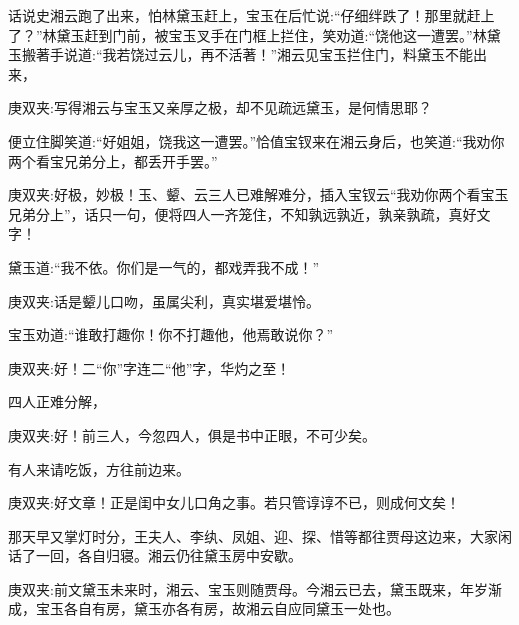 \begin{parag}
    话说史湘云跑了出来，怕林黛玉赶上，宝玉在后忙说:“仔细绊跌了！那里就赶上了？”林黛玉赶到门前，被宝玉叉手在门框上拦住，笑劝道:“饶他这一遭罢。”林黛玉搬著手说道:“我若饶过云儿，再不活著！”湘云见宝玉拦住门，料黛玉不能出来，\begin{note}庚双夹:写得湘云与宝玉又亲厚之极，却不见疏远黛玉，是何情思耶？\end{note}便立住脚笑道:“好姐姐，饶我这一遭罢。”恰值宝钗来在湘云身后，也笑道:“我劝你两个看宝兄弟分上，都丢开手罢。”\begin{note}庚双夹:好极，妙极！玉、颦、云三人已难解难分，插入宝钗云“我劝你两个看宝玉兄弟分上”，话只一句，便将四人一齐笼住，不知孰远孰近，孰亲孰疏，真好文字！\end{note}黛玉道:“我不依。你们是一气的，都戏弄我不成！”\begin{note}庚双夹:话是颦儿口吻，虽属尖利，真实堪爱堪怜。\end{note}宝玉劝道:“谁敢打趣你！你不打趣他，他焉敢说你？”\begin{note}庚双夹:好！二“你”字连二“他”字，华灼之至！\end{note}四人正难分解，\begin{note}庚双夹:好！前三人，今忽四人，俱是书中正眼，不可少矣。\end{note}有人来请吃饭，方往前边来。\begin{note}庚双夹:好文章！正是闺中女儿口角之事。若只管谆谆不已，则成何文矣！\end{note}
\end{parag}


\begin{parag}
    那天早又掌灯时分，王夫人、李纨、凤姐、迎、探、惜等都往贾母这边来，大家闲话了一回，各自归寝。湘云仍往黛玉房中安歇。\begin{note}庚双夹:前文黛玉未来时，湘云、宝玉则随贾母。今湘云已去，黛玉既来，年岁渐成，宝玉各自有房，黛玉亦各有房，故湘云自应同黛玉一处也。\end{note}
\end{parag}


